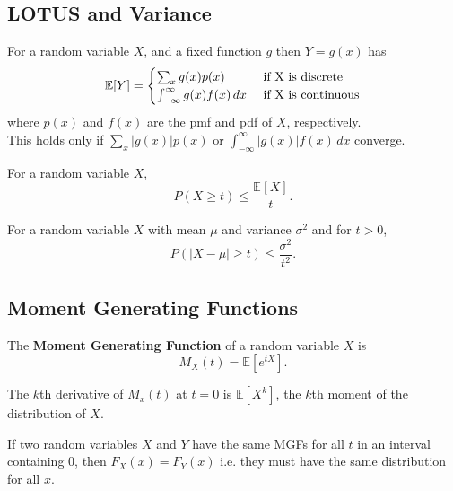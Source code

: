 \subsection{LOTUS and Variance}

\begin{theorem}
For a random variable $X$, and a fixed function $g$ then $Y = g(x)$ has
\[
    \mathbb{E}[Y] = \begin{cases}
        \sum_x g(x)p(x) &\text{ if } $X$ \text{ is discrete}   \\
        \int_{-\infty}^{\infty} g(x)f(x) \, dx&\text{ if } $X$ \text{ is continuous} 
    \end{cases}
\]
where $p(x)$ and $f(x)$ are the pmf and pdf of $X$, respectively. \\

This holds only if $\sum_x |g(x)| p(x)$ or $\int_{-\infty}^{\infty} |g(x)|f(x) \, dx$ converge.
\end{theorem}

\begin{theorem}
    For a random variable $X$,
    \[
        P(X \geq t) \leq \frac{\mathbb{E}_{}\left[ X\right]}{t}.
    \]
\end{theorem}
\begin{theorem}
For a random variable $X$ with mean $\mu $ and variance $\sigma^2$ and for $t > 0$,
\[
    P(|X - \mu| \geq t) \leq \frac{\sigma ^2}{t^2}.
\]
\end{theorem}


\subsection{Moment Generating Functions}
\begin{definition}
The \textbf{Moment Generating Function} of a random variable $X$ is 
\[
    M_X(t) = \mathbb{E}\left[ e^{tX} \right]. 
\]

The $k$th derivative of $M_x(t)$ at $t=0$ is $\mathbb{E}\left[X^k \right]$, the $k$th moment of the distribution of $X$. 
\end{definition}

\begin{theorem}
If two random variables $X$ and $Y$ have the same MGFs for all $t$ in an interval containing $0$, then $F_X(x) = F_Y(x)$ i.e. they must have the same distribution for all $x$.
\end{theorem}

